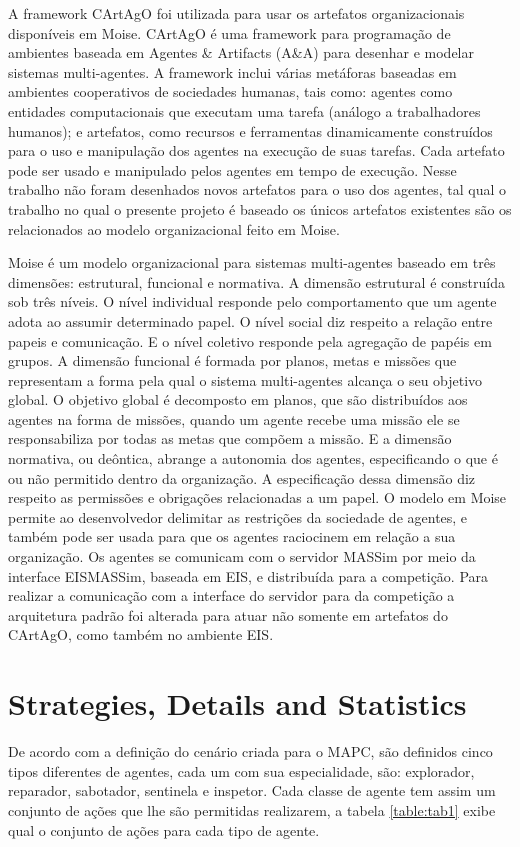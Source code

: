 \documentclass{llncs}
\begin{document}
A framework CArtAgO foi utilizada para usar os artefatos organizacionais disponíveis em Moise. CArtAgO é uma framework para programação de ambientes baseada em Agentes \& Artifacts (A\&A) para desenhar e modelar sistemas multi-agentes. A framework inclui várias metáforas baseadas em ambientes cooperativos de sociedades humanas, tais como: agentes como entidades computacionais que executam uma tarefa (análogo a trabalhadores humanos); e artefatos, como recursos e ferramentas dinamicamente construídos para o uso e manipulação dos agentes na execução de suas tarefas. Cada artefato pode ser usado e manipulado pelos agentes em tempo de execução. Nesse trabalho não foram desenhados novos artefatos para o uso dos agentes, tal qual o trabalho no qual o presente projeto é baseado os únicos artefatos existentes são os relacionados ao modelo organizacional feito em Moise. 

Moise é um modelo organizacional para sistemas multi-agentes baseado em três dimensões: estrutural, funcional e normativa. 
A dimensão estrutural é construída sob três níveis. O nível individual responde pelo comportamento que um agente adota ao assumir determinado papel. O nível social diz respeito a relação entre papeis e comunicação. E o nível coletivo responde pela agregação de papéis em grupos. 
A dimensão funcional é formada por planos, metas e missões que representam a forma pela qual o sistema multi-agentes alcança o seu objetivo global. O objetivo global é decomposto em planos, que são distribuídos aos agentes na forma de missões, quando um agente recebe uma missão ele se responsabiliza por todas as metas que compõem a missão.
E a dimensão normativa, ou deôntica, abrange a autonomia dos agentes, especificando o que é ou não permitido dentro da organização. A especificação dessa dimensão diz respeito as permissões e obrigações relacionadas a um papel.
O modelo em Moise permite ao desenvolvedor delimitar as restrições da sociedade de agentes, e também pode ser usada para que os agentes raciocinem em relação a sua organização. 
Os agentes se comunicam com o servidor MASSim por meio da interface EISMASSim, baseada em EIS, e distribuída para a competição. Para realizar a comunicação com a interface do servidor para da competição a arquitetura padrão foi alterada para atuar não somente em artefatos do CArtAgO, como também no ambiente EIS.

\section{Strategies, Details and Statistics}\label{sec:strategies}
De acordo com a definição do cenário criada para o MAPC, são definidos cinco tipos diferentes de agentes, cada um com sua especialidade, são: explorador, reparador, sabotador, sentinela e inspetor. Cada classe de agente tem assim um conjunto de ações que lhe são permitidas realizarem, a tabela \ref{table:tab1} exibe qual o conjunto de ações para cada tipo de agente. 
\end{document}
